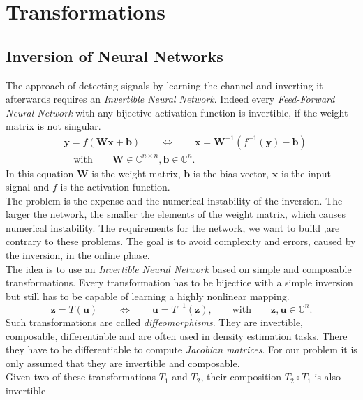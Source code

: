 \documentclass[oneside]{msvreport}%
\newcommand{\B}[1]{\boldsymbol{#1}}
\newcommand{\e}[1]{\emph{#1}}
\begin{document}
\section{Transformations}
\subsection{Inversion of Neural Networks}
The approach of detecting signals by learning the channel and inverting it afterwards requires an \emph{Invertible Neural Network}. Indeed every \emph{Feed-Forward Neural Network} with any bijective activation function is invertible, if the weight matrix is not singular.
\begin{equation}
\begin{split}
  & \B{y} =f(\B{Wx} + \B{b}) \qquad \Leftrightarrow \qquad \B{x} = \B{W}^{-1}(f^{-1}(\B{y}) - \B{b}) \\& \quad  \text{with} \qquad \B{W} \in \mathbb{C}^{n \times n}, \B{b} \in \mathbb{C}^n.
\end{split}
\end{equation}
In this equation $\B{W}$ is the weight-matrix, $\B{b}$ is the bias vector, $\B{x}$ is the input signal and $f$ is the activation function.\\ The problem is the expense and the numerical instability of the inversion. The larger the network, the smaller the elements of the weight matrix, which causes numerical instability. The requirements for the network, we want to build ,are contrary to these problems. The goal is to avoid complexity and errors, caused by the inversion, in the online phase.\\ The idea is to use an \e{Invertible Neural Network} based on simple and composable transformations. Every transformation has to be bijectice with a simple inversion but still has to be capable of learning a highly nonlinear mapping.
\begin{equation}
  \B{z} = T(\B{u}) \qquad \Leftrightarrow \qquad \B{u} = T^{-1}(\B{z}), \qquad \text{with} \qquad \B{z}, \B{u} \in \mathbb{C}^n.
\end{equation}
Such transformations are called \emph{diffeomorphisms}. They are invertible, composable, differentiable and are often used in density estimation tasks. There they have to be differentiable to compute \e{Jacobian matrices}. For our problem it is only assumed that they are invertible and composable.\\ Given two of these transformations $T_1$ and $T_2$, their composition $T_2 \circ T_1$ is also invertible
\end{document}
